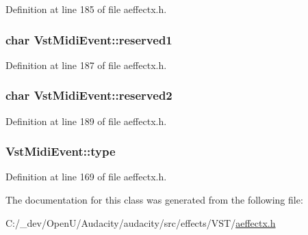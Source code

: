 Definition at line 185 of file aeffectx.\+h.

\subsubsection[{\texorpdfstring{reserved1}{reserved1}}]{\setlength{\rightskip}{0pt plus 5cm}char Vst\+Midi\+Event\+::reserved1}\hypertarget{class_vst_midi_event_a1e5ad2e468a403f0203039f88a0a9a47}{}\label{class_vst_midi_event_a1e5ad2e468a403f0203039f88a0a9a47}


Definition at line 187 of file aeffectx.\+h.

\subsubsection[{\texorpdfstring{reserved2}{reserved2}}]{\setlength{\rightskip}{0pt plus 5cm}char Vst\+Midi\+Event\+::reserved2}\hypertarget{class_vst_midi_event_a94af5f8e5bb4a2bf11dc67f809f5680f}{}\label{class_vst_midi_event_a94af5f8e5bb4a2bf11dc67f809f5680f}


Definition at line 189 of file aeffectx.\+h.

\subsubsection[{\texorpdfstring{type}{type}}]{ Vst\+Midi\+Event\+::type}\hypertarget{class_vst_midi_event_ad8d058890e398849d1569d01137afcb0}{}\label{class_vst_midi_event_ad8d058890e398849d1569d01137afcb0}


Definition at line 169 of file aeffectx.\+h.



The documentation for this class was generated from the following file\+:\begin{DoxyCompactItemize}
\item 
C\+:/\+\_\+dev/\+Open\+U/\+Audacity/audacity/src/effects/\+V\+S\+T/\hyperlink{aeffectx_8h}{aeffectx.\+h}\end{DoxyCompactItemize}
